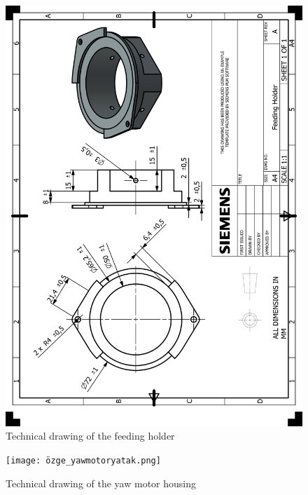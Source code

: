 \documentclass[12pt]{report}
\begin{document}
\begin{appendices}
\begin{figure}[H]
    \centering
    \includegraphics[width=\textwidth]{HP_Feeding Holder.png} 
    \caption{Technical drawing of the feeding holder}
    \label{fig:technical-drawing}
\end{figure}

\begin{figure}[H]
    \centering
    \texttt{[image: özge\_yawmotoryatak.png]} 
    \caption{Technical drawing of the yaw motor housing}
    \label{fig:technical-drawing}
\end{figure}


\end{appendices}
\end{document}
